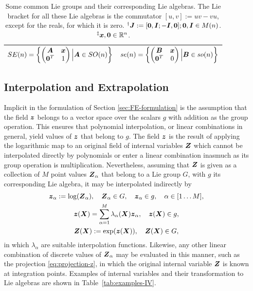 \documentclass[12pt]{article}
\newcommand{\mbs}[1]{\boldsymbol{#1}}
\newcommand{\mbb}[1]{\mathbb{#1}}
\def\bA{{\mbs{A}}} \def\bB{{\mbs{B}}} \def\bC{{\mbs{C}}}
\def\bJ{{\mbs{J}}} \def\bK{{\mbs{K}}} \def\bL{{\mbs{L}}}
\begin{document}
\begin{table}[htbp]
\begin{center}
\begin{tabular}{ l l }
      \\
      $SE(n)=\left\{
      \begin{pmatrix}
        \bA & \bx
        \\
        \mathbf{0}^T & 1
      \end{pmatrix}
      \Big | \bA \in SO(n) \right\}$
      &
      $se(n)=\left\{
      \begin{pmatrix}
        \bB & \bx
        \\
        \mathbf{0}^T & 0
      \end{pmatrix}
      \Big | \bB \in so(n) \right\}$
      \\
      \bottomrule
    \end{tabular}
    \caption{Some common Lie groups and their corresponding Lie
      algebras. The Lie bracket for all these Lie algebras is the
      commutator $[u,v] := uv - vu$, except for the reals, for which
      it is zero. $^\dagger \bJ := [\mathbf{0}, \bI; -\bI, \mathbf{0}];
      \mathbf{0}, \bI \in M(n)$. $^\ddagger \bx, \mathbf{0} \in \mbb{R}^n$.}
    \label{tab:Lie-groups-and-algebras}
  \end{center}
\end{table}

\subsection{Interpolation and Extrapolation}

Implicit in the formulation of Section \ref{sec:FE-formulation} is the
assumption that the field $\bz$ belongs to a vector space over the scalars $g$
with addition as the group operation.  This ensures that polynomial
interpolation, or linear combinations in general, yield values of $\bz$ that
belong to $g$. The field $\bz$ is the result of applying the logarithmic map to
an original field of internal variables $\bZ$ which cannot be interpolated
directly by polynomials or enter a linear combination inasmuch as its group
operation is multiplication.  Nevertheless, assuming that $\bZ$ is given as a
collection of $M$ point values $\bZ_\alpha$ that belong to a Lie group $G$, with
$g$ its corresponding Lie algebra, it may be interpolated indirectly by
\begin{gather} \label{eq:interpolation-begin}
  \bz_\alpha := \log(\bZ_\alpha),
  \quad \bZ_\alpha \in G,
  \quad \bz_\alpha \in g,
  \quad \alpha \in [1 \ldots M],
  \\
  \bz(\bX) = \sum_{\alpha=1}^M \lambda_\alpha(\bX) \bz_\alpha,
  \quad \bz(\bX) \in g,
  \\
  \bZ(\bX) := \exp(\bz(\bX)),
  \quad \bZ(\bX) \in G, \label{eq:interpolation-end}
\end{gather}
in which $\lambda_\alpha$ are suitable interpolation
functions.  Likewise, any other linear combination of discrete values
of $\bZ_\alpha$ may be evaluated in this manner, such as the
projection \eqref{eq:projection-z}, in which the original internal
variable $\bZ$ is known at integration points. Examples of internal
variables and their transformation to Lie algebras are shown in
Table~\ref{tab:examples-IV}.
\end{document}
